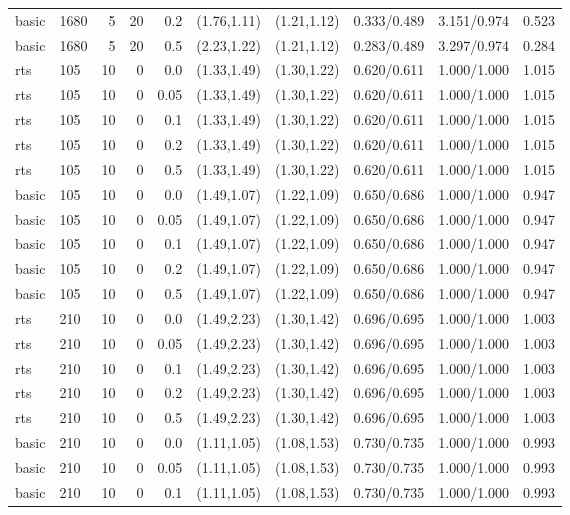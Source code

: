 \begin{tabular}{llrrrccccc}
basic & 1680 & 5 & 20 & 0.2 & (1.76,1.11) & (1.21,1.12) & 0.333/0.489 & 3.151/0.974 & 0.523 \\
basic & 1680 & 5 & 20 & 0.5 & (2.23,1.22) & (1.21,1.12) & 0.283/0.489 & 3.297/0.974 & 0.284 \\
rts & 105 & 10 & 0 & 0.0 & (1.33,1.49) & (1.30,1.22) & 0.620/0.611 & 1.000/1.000 & 1.015 \\
rts & 105 & 10 & 0 & 0.05 & (1.33,1.49) & (1.30,1.22) & 0.620/0.611 & 1.000/1.000 & 1.015 \\
rts & 105 & 10 & 0 & 0.1 & (1.33,1.49) & (1.30,1.22) & 0.620/0.611 & 1.000/1.000 & 1.015 \\
rts & 105 & 10 & 0 & 0.2 & (1.33,1.49) & (1.30,1.22) & 0.620/0.611 & 1.000/1.000 & 1.015 \\
rts & 105 & 10 & 0 & 0.5 & (1.33,1.49) & (1.30,1.22) & 0.620/0.611 & 1.000/1.000 & 1.015 \\
basic & 105 & 10 & 0 & 0.0 & (1.49,1.07) & (1.22,1.09) & 0.650/0.686 & 1.000/1.000 & 0.947 \\
basic & 105 & 10 & 0 & 0.05 & (1.49,1.07) & (1.22,1.09) & 0.650/0.686 & 1.000/1.000 & 0.947 \\
basic & 105 & 10 & 0 & 0.1 & (1.49,1.07) & (1.22,1.09) & 0.650/0.686 & 1.000/1.000 & 0.947 \\
basic & 105 & 10 & 0 & 0.2 & (1.49,1.07) & (1.22,1.09) & 0.650/0.686 & 1.000/1.000 & 0.947 \\
basic & 105 & 10 & 0 & 0.5 & (1.49,1.07) & (1.22,1.09) & 0.650/0.686 & 1.000/1.000 & 0.947 \\
rts & 210 & 10 & 0 & 0.0 & (1.49,2.23) & (1.30,1.42) & 0.696/0.695 & 1.000/1.000 & 1.003 \\
rts & 210 & 10 & 0 & 0.05 & (1.49,2.23) & (1.30,1.42) & 0.696/0.695 & 1.000/1.000 & 1.003 \\
rts & 210 & 10 & 0 & 0.1 & (1.49,2.23) & (1.30,1.42) & 0.696/0.695 & 1.000/1.000 & 1.003 \\
rts & 210 & 10 & 0 & 0.2 & (1.49,2.23) & (1.30,1.42) & 0.696/0.695 & 1.000/1.000 & 1.003 \\
rts & 210 & 10 & 0 & 0.5 & (1.49,2.23) & (1.30,1.42) & 0.696/0.695 & 1.000/1.000 & 1.003 \\
basic & 210 & 10 & 0 & 0.0 & (1.11,1.05) & (1.08,1.53) & 0.730/0.735 & 1.000/1.000 & 0.993 \\
basic & 210 & 10 & 0 & 0.05 & (1.11,1.05) & (1.08,1.53) & 0.730/0.735 & 1.000/1.000 & 0.993 \\
basic & 210 & 10 & 0 & 0.1 & (1.11,1.05) & (1.08,1.53) & 0.730/0.735 & 1.000/1.000 & 0.993 \\

\end{tabular}
